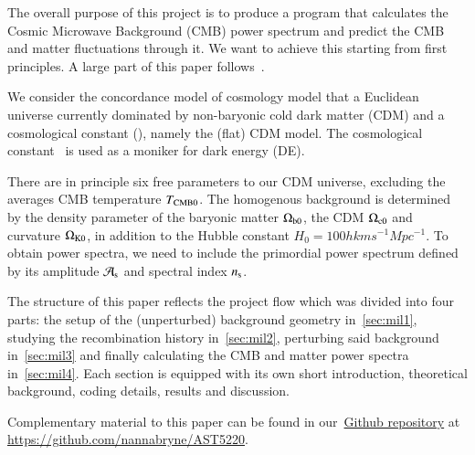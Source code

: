 






The overall purpose of this project is to produce a program that calculates the Cosmic Microwave Background (CMB) power spectrum and predict the CMB and matter fluctuations through it. We want to achieve this starting from first principles. A large part of this paper follows~\citet{Callin2006}.

We consider the concordance model of cosmology model that a Euclidean universe currently dominated by non-baryonic cold dark matter (CDM) and a cosmological constant (\textLambda), namely the (flat) \textLambda CDM model. The cosmological constant \textLambda\, is used as a moniker for dark energy (DE).~\citep{DodelsonBook}

There are in principle six free parameters to our \textLambda CDM universe, excluding the averages CMB temperature $T_{\mathrm{CMB}0}$. The homogenous background is determined by the density parameter of the baryonic matter $\Omega_\mathrm{b0}$, the CDM $\Omega_\mathrm{c0}$ and curvature $\Omega_\mathrm{K0}$, in addition to the Hubble constant $H_0 =100h \unit{km} \unit{s^{-1}} \unit{Mpc^{-1}}$. To obtain power spectra, we need to include the primordial power spectrum defined by its amplitude $\mathcal{A}_\mathrm{s}$ and spectral index $n_\mathrm{s}$.


The structure of this paper reflects the project flow which was divided into four parts: the setup of the (unperturbed) background geometry in~\cref{sec:mil1}, studying the recombination history in~\cref{sec:mil2}, perturbing said background in~\cref{sec:mil3} and finally calculating the CMB and matter power spectra in~\cref{sec:mil4}. Each section is equipped with its own short introduction, theoretical background, coding details, results and discussion. 

Complementary material to this paper can be found in our~\href{https://github.com/nannabryne/AST5220}{Github repository} at \url{https://github.com/nannabryne/AST5220}.